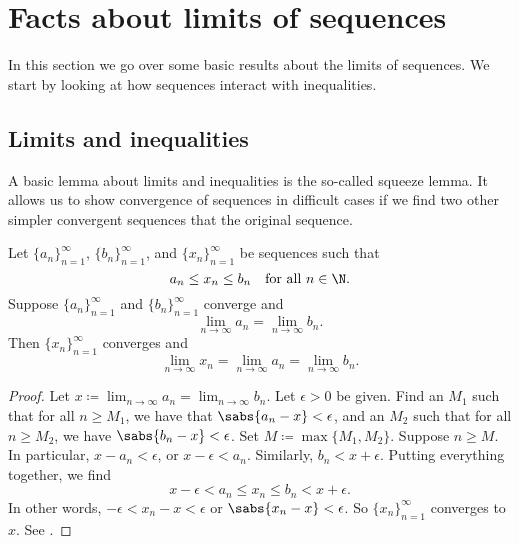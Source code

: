 
\sectionnewpage
\section{Facts about limits of sequences}
\label{sec:factslimsseqs}



In this section we go over some basic results about the limits of
sequences.
We start by looking at how sequences interact with inequalities.

\subsection{Limits and inequalities}

A basic lemma about limits and inequalities is the so-called squeeze lemma.
It allows us to show convergence of sequences in difficult cases
if we find two other simpler convergent sequences that 
 the original sequence.

\begin{lemma} \label{squeeze:lemma}
Let $\{ a_n \}_{n=1}^\infty$, 
$\{ b_n \}_{n=1}^\infty$, and 
$\{ x_n \}_{n=1}^\infty$ be sequences such that
\begin{equation*}
a_n \leq x_n \leq b_n \quad \text{for all } n \in \N.
\end{equation*}
Suppose $\{ a_n \}_{n=1}^\infty$ and $\{ b_n \}_{n=1}^\infty$ converge and
\begin{equation*}
\lim_{n\to \infty} a_n
=
\lim_{n\to \infty} b_n .
\end{equation*}
Then $\{ x_n \}_{n=1}^\infty$ converges and
\begin{equation*}
\lim_{n\to \infty} x_n
=
\lim_{n\to \infty} a_n
=
\lim_{n\to \infty} b_n .
\end{equation*}
\end{lemma}

\begin{proof}
Let $x \coloneqq \lim_{n\to\infty} a_n = \lim_{n\to\infty} b_n$.
Let $\epsilon > 0$ be given.
Find an $M_1$ such that for all $n \geq M_1$, we have
that $\sabs{a_n-x} < \epsilon$, and an $M_2$
such that for all $n \geq M_2$,
we have $\sabs{b_n-x} < \epsilon$.  Set $M \coloneqq \max \{M_1, M_2 \}$.
Suppose $n \geq M$.
In particular,
$x - a_n < \epsilon$, or 
$x - \epsilon < a_n$.  Similarly, $b_n < x + \epsilon$.
Putting everything together, we find
\begin{equation*}
x - \epsilon < a_n \leq x_n \leq b_n < x + \epsilon .
\end{equation*}
In other words, $-\epsilon < x_n-x < \epsilon$ or $\sabs{x_n-x} < \epsilon$.
So $\{x_n\}_{n=1}^\infty$ converges to $x$.
See .
\end{proof}


